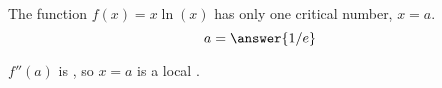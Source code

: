 \documentclass{ximera}
\author{Steven Gubkin}
\begin{document}
\begin{exercise}

The function $f(x) = x\ln(x)$ has only one critical number, $x=a$. 
$$
a = \answer{1/e}
$$


$f''(a)$ is , so $x=a$ is a local .




\end{exercise}
\end{document}

